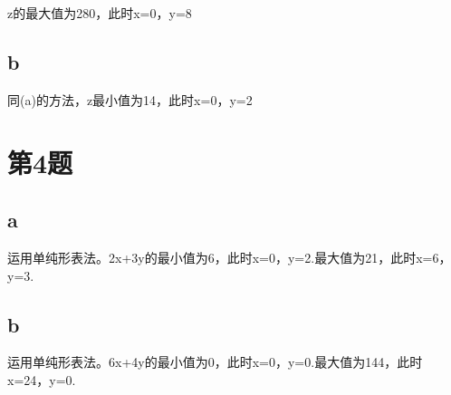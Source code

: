 \documentclass{article}
\begin{document}
z的最大值为280，此时x=0，y=8


\subsection{b}
同(a)的方法，z最小值为14，此时x=0，y=2

\newpage

\section{第4题}

\subsection{a}
运用单纯形表法。2x+3y的最小值为6，此时x=0，y=2.最大值为21，此时x=6，y=3.

\subsection{b}
运用单纯形表法。6x+4y的最小值为0，此时x=0，y=0.最大值为144，此时x=24，y=0.
\end{document}
